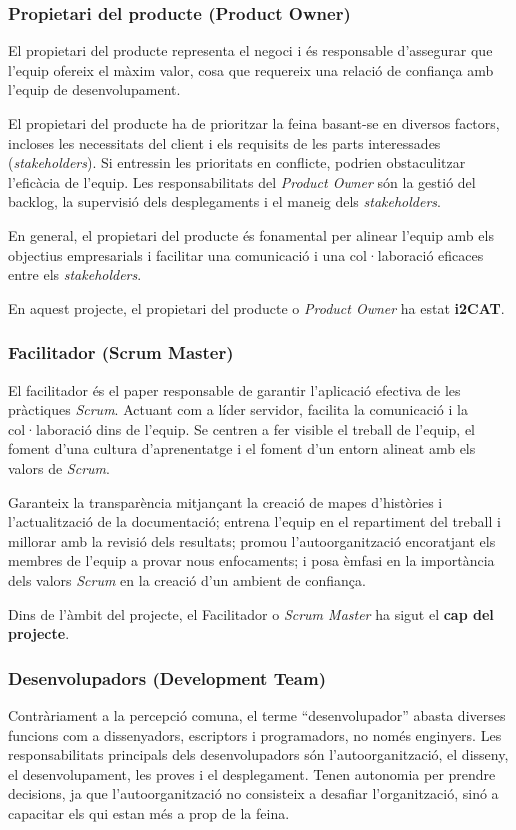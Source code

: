 \subsubsection{Propietari del producte (Product Owner)}
El propietari del producte representa el negoci i és responsable d'assegurar que l'equip ofereix el màxim valor, cosa que requereix una relació de confiança amb l'equip de desenvolupament.

El propietari del producte ha de prioritzar la feina basant-se en diversos factors, incloses les necessitats del client i els requisits de les parts interessades (\textit{stakeholders}). Si entressin les prioritats en conflicte, podrien obstaculitzar l'eficàcia de l'equip. Les responsabilitats del \textit{Product Owner} són la gestió del backlog, la supervisió dels desplegaments i el maneig dels \textit{stakeholders}.

En general, el propietari del producte és fonamental per alinear l'equip amb els objectius empresarials i facilitar una comunicació i una col·laboració eficaces entre els \textit{stakeholders}.

En aquest projecte, el propietari del producte o \textit{Product Owner} ha estat \textbf{i2CAT}.


\subsubsection{Facilitador (Scrum Master)}
El facilitador és el paper responsable de garantir l'aplicació efectiva de les pràctiques \textit{Scrum}. Actuant com a líder servidor, facilita la comunicació i la col·laboració dins de l'equip. Se centren a fer visible el treball de l'equip, el foment d'una cultura d'aprenentatge i el foment d'un entorn alineat amb els valors de \textit{Scrum}.

Garanteix la transparència mitjançant la creació de mapes d'històries i l'actualització de la documentació; entrena l'equip en el repartiment del treball i millorar amb la revisió dels resultats; promou l'autoorganització encoratjant els membres de l'equip a provar nous enfocaments; i posa èmfasi en la importància dels valors \textit{Scrum} en la creació d'un ambient de confiança.

Dins de l'àmbit del projecte, el Facilitador o \textit{Scrum Master} ha sigut el \textbf{cap del projecte}.


\subsubsection{Desenvolupadors (Development Team)}
Contràriament a la percepció comuna, el terme ``desenvolupador'' abasta diverses funcions com a dissenyadors, escriptors i programadors, no només enginyers. Les responsabilitats principals dels desenvolupadors són l'autoorganització, el disseny, el desenvolupament, les proves i el desplegament. Tenen autonomia per prendre decisions, ja que l'autoorganització no consisteix a desafiar l'organització, sinó a capacitar els qui estan més a prop de la feina. 

